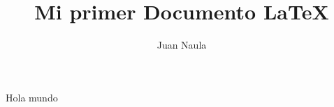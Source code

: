 \documentclass{article}
\title{Mi primer Documento \LaTeX}
\author{Juan Naula}
\begin{document}
\maketitle
Hola mundo
\end{document}

